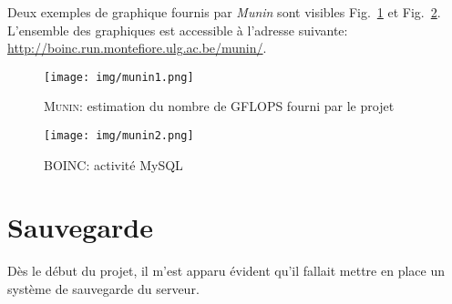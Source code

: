 \documentclass[a4paper, 11pt]{report}
\begin{document}
Deux exemples de graphique fournis par \textit{Munin} sont visibles Fig.~\ref{munin1} et Fig.~\ref{munin2}. L'ensemble des graphiques est accessible à l'adresse suivante: \url{http://boinc.run.montefiore.ulg.ac.be/munin/}.

\begin{figure}[!h]
\centering
\texttt{[image: img/munin1.png]}
\caption{\textsc{Munin}: estimation du nombre de GFLOPS fourni par le projet}
\label{munin1}
\end{figure}

\begin{figure}[!h]
\centering
\texttt{[image: img/munin2.png]}
\caption{\textsc{BOINC}: activité MySQL}
\label{munin2}
\end{figure}


\section{Sauvegarde}
Dès le début du projet, il m'est apparu évident qu'il fallait mettre en place un système de sauvegarde du serveur.
\end{document}
